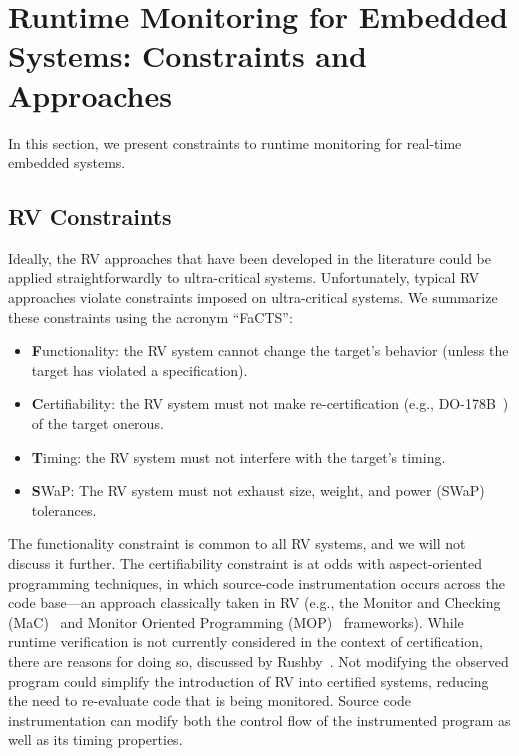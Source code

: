 \section{Runtime Monitoring for Embedded Systems: Constraints and Approaches}
\label{sec:constraintsApproaches}
In this section, we  present constraints to runtime monitoring for
real-time embedded systems. 

\subsection{RV Constraints}\label{sec:constraints}

Ideally, the RV approaches that have been developed in the literature could be
applied straightforwardly to ultra-critical systems.  Unfortunately,
typical RV approaches violate constraints imposed on ultra-critical
systems. We summarize these
constraints using the acronym ``FaCTS'':

\begin{itemize}
\item {\bf F}unctionality: the RV system cannot change the target's behavior (unless the
  target has violated a specification).
\item {\bf C}ertifiability: the RV system must not make re-certification (e.g.,
  DO-178B~\cite{DO178B}) of the target onerous.
\item {\bf T}iming: the RV system must not interfere with the target's timing.
\item {\bf S}WaP: The RV system must not exhaust size, weight, and power (SWaP)
  tolerances.
\end{itemize}

The functionality constraint is common to all RV systems, and we will not
discuss it further.  The certifiability constraint is at odds with
aspect-oriented programming techniques, in which source-code instrumentation
occurs across the code base---an approach classically taken in RV (e.g., the
Monitor and Checking (MaC)~\cite{KimVBKLS99} and Monitor Oriented Programming
(MOP)~\cite{ChenR05} frameworks).  While runtime verification is not currently
considered in the context of certification, there are reasons for doing so,
discussed by Rushby~\cite{rushbyrv}.  Not modifying the observed program could
simplify the introduction of RV into certified systems, reducing the need to
re-evaluate code that is being monitored.  Source code instrumentation can
modify both the control flow of the instrumented program as well as its timing
properties.  

